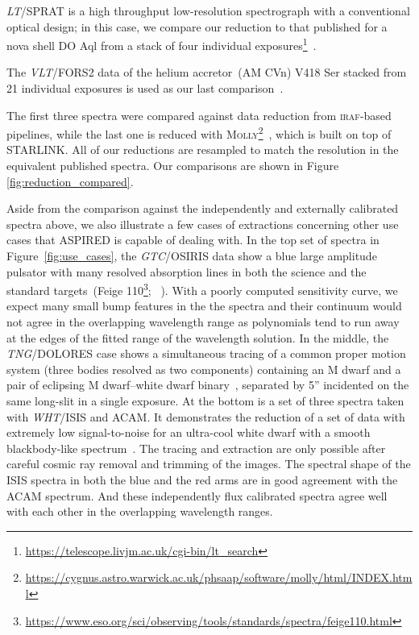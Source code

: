 \documentclass[linenumbers, twocolumn]{aastex631}
\begin{document}
\textit{LT}/SPRAT is a high throughput low-resolution spectrograph with
a conventional optical design; in this case, we compare our reduction to that published for a nova 
shell DO Aql from a stack of four individual 
exposures\footnote{\url{https://telescope.livjm.ac.uk/cgi-bin/lt_search}}~\citep{2020MNRAS.499.2959H}. 

The \textit{VLT}/FORS2 data
of the helium accretor~(AM CVn) V418 Ser stacked from 21 individual exposures is
used as our last comparison~\citep{2020MNRAS.496.1243G}. 

The first three spectra were 
compared against data reduction from \textsc{iraf}-based pipelines, while the
last one is reduced with \textsc{Molly}\footnote{
\url{https://cygnus.astro.warwick.ac.uk/phsaap/software/molly/html/INDEX.html}}~\citep{2019ascl.soft07012M},
which is built on top of \textsc{STARLINK}. All of our reductions are resampled to match
the resolution in the equivalent published spectra. Our comparisons are shown in Figure \ref{fig:reduction_compared}.

Aside from the comparison against the independently and externally calibrated
spectra above, we also illustrate a few cases of extractions concerning
other use cases that \textsc{ASPIRED} is capable of dealing with. In the top set
of spectra in Figure~\ref{fig:use_cases}, the \textit{GTC}/OSIRIS data show a
blue large amplitude pulsator with many resolved absorption lines in both the
science and the standard targets~(Feige 110\footnote{
\url{https://www.eso.org/sci/observing/tools/standards/spectra/feige110.html}};
~\citealp{2022MNRAS.511.4971M}). With a poorly computed sensitivity curve, we
expect many small bump features in the the spectra and their continuum would
not agree in the overlapping wavelength range as polynomials tend to run away
at the edges of the fitted range of the wavelength solution. In the middle,
the \textit{TNG}/DOLORES case shows a simultaneous tracing of a common proper
motion system (three bodies resolved as two components) containing an M dwarf
and a pair of eclipsing M dwarf--white dwarf binary~\citep{2022MNRAS.509.4171K},
separated by 5'' incidented on the same long-slit in a single exposure.
At the bottom is a set of three spectra taken with \textit{WHT}/ISIS and ACAM.
It demonstrates the reduction of a set of data with extremely low signal-to-noise
for an ultra-cool white dwarf with a smooth blackbody-like
spectrum~\citep{2020MNRAS.493.6001L}. The tracing and extraction are only
possible after careful cosmic ray removal and trimming of the images. The
spectral shape of the ISIS spectra in both the blue and the red arms are in good
agreement with the ACAM spectrum. And these independently flux calibrated
spectra agree well with each other in the overlapping wavelength ranges.
\end{document}
